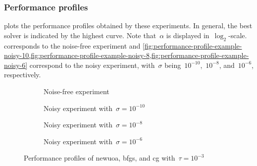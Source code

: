 \subsubsection{Performance profiles}

 plots the performance profiles obtained by these experiments.
In general, the best solver is indicated by the highest curve.
Note that~$\alpha$ is displayed in~$\log_2$-scale.
 corresponds to the noise-free experiment and \cref{fig:performance-profile-example-noisy-10,fig:performance-profile-example-noisy-8,fig:performance-profile-example-noisy-6} correspond to the noisy experiment, with~$\sigma$ being~$10^{-10}$,~$10^{-8}$, and~$10^{-6}$, respectively.

\begin{figure}[ht]
    \centering
    \begin{subfigure}[b]{0.49\textwidth}
        \centering
        \caption{Noise-free experiment}
        \label{fig:performance-profile-example-noiseless}
    \end{subfigure}
    \hfill
    \begin{subfigure}[b]{0.49\textwidth}
        \centering
        \caption{Noisy experiment with~$\sigma = 10^{-10}$}
        \label{fig:performance-profile-example-noisy-10}
    \end{subfigure}
    \par\bigskip
    \begin{subfigure}[b]{0.49\textwidth}
        \centering
        \caption{Noisy experiment with~$\sigma = 10^{-8}$}
        \label{fig:performance-profile-example-noisy-8}
    \end{subfigure}
    \hfill
    \begin{subfigure}[b]{0.49\textwidth}
        \centering
        \caption{Noisy experiment with~$\sigma = 10^{-6}$}
        \label{fig:performance-profile-example-noisy-6}
    \end{subfigure}
    \caption{Performance profiles of \gls{newuoa}, \gls{bfgs}, and \gls{cg} with~$\tau = 10^{-3}$}
    \label{fig:performance-profile-example}
\end{figure}


